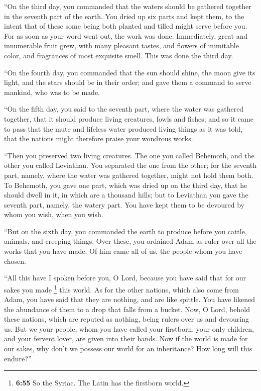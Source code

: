 ``On the third day, you commanded that the waters should
be gathered together in the seventh part of the earth. You dried up six
parts and kept them, to the intent that of these some being both planted
and tilled might serve before you.  For as soon as your
word went out, the work was done.  Immediately, great and
innumerable fruit grew, with many pleasant tastes, and flowers of
inimitable color, and fragrances of most exquisite smell. This was done
the third day.

 ``On the fourth day, you commanded that the sun should
shine, the moon give its light, and the stars should be in their order;
 and gave them a command to serve mankind, who was to be
made.

 ``On the fifth day, you said to the seventh part, where
the water was gathered together, that it should produce living
creatures, fowls and fishes; and so it came to pass  that
the mute and lifeless water produced living things as it was told, that
the nations might therefore praise your wondrous works.

 ``Then you preserved two living creatures. The one you
called Behemoth, and the other you called Leviathan.  You
separated the one from the other; for the seventh part, namely, where
the water was gathered together, might not hold them both.
 To Behemoth, you gave one part, which was dried up on
the third day, that he should dwell in it, in which are a thousand
hills;  but to Leviathan you gave the seventh part,
namely, the watery part. You have kept them to be devoured by whom you
wish, when you wish.

 ``But on the sixth day, you commanded the earth to
produce before you cattle, animals, and creeping things. 
Over these, you ordained Adam as ruler over all the works that you have
made. Of him came all of us, the people whom you have chosen.

 ``All this have I spoken before you, O Lord, because you
have said that for our sakes you made \footnote{\textbf{6:55} So the
  Syriac. The Latin has the firstborn world.} this world.
 As for the other nations, which also come from Adam, you
have said that they are nothing, and are like spittle. You have likened
the abundance of them to a drop that falls from a bucket.
 Now, O Lord, behold these nations, which are reputed as
nothing, being rulers over us and devouring us.  But we
your people, whom you have called your firstborn, your only children,
and your fervent lover, are given into their hands.  Now
if the world is made for our sakes, why don't we possess our world for
an inheritance? How long will this endure?''

